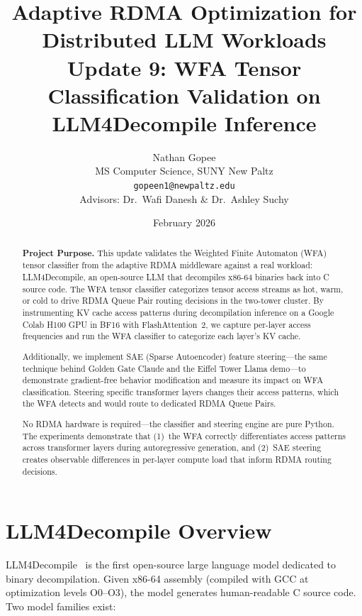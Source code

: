\documentclass[11pt,letterpaper]{article}
\title{\textbf{Adaptive RDMA Optimization for Distributed LLM Workloads}\\[0.5em]
\large Update 9: WFA Tensor Classification Validation on LLM4Decompile Inference}
\author{Nathan Gopee\\
MS Computer Science, SUNY New Paltz\\
\texttt{gopeen1@newpaltz.edu}\\[1em]
\small Advisors: Dr.\ Wafi Danesh \& Dr.\ Ashley Suchy}
\date{February 2026}
\begin{document}
\maketitle

\begin{abstract}
\noindent
\textbf{Project Purpose.}
This update validates the Weighted Finite Automaton (WFA) tensor classifier from the adaptive RDMA middleware against a real workload: LLM4Decompile, an open-source LLM that decompiles x86-64 binaries back into C source code. The WFA tensor classifier categorizes tensor access streams as hot, warm, or cold to drive RDMA Queue Pair routing decisions in the two-tower cluster. By instrumenting KV cache access patterns during decompilation inference on a Google Colab H100 GPU in BF16 with FlashAttention~2, we capture per-layer access frequencies and run the WFA classifier to categorize each layer's KV cache.

Additionally, we implement SAE (Sparse Autoencoder) feature steering---the same technique behind Golden Gate Claude and the Eiffel Tower Llama demo---to demonstrate gradient-free behavior modification and measure its impact on WFA classification. Steering specific transformer layers changes their access patterns, which the WFA detects and would route to dedicated RDMA Queue Pairs.

No RDMA hardware is required---the classifier and steering engine are pure Python. The experiments demonstrate that (1)~the WFA correctly differentiates access patterns across transformer layers during autoregressive generation, and (2)~SAE steering creates observable differences in per-layer compute load that inform RDMA routing decisions.
\end{abstract}

\tableofcontents
\newpage

\section{LLM4Decompile Overview}
\label{sec:llm4decompile}

LLM4Decompile~\cite{llm4decompile} is the first open-source large language model dedicated to binary decompilation. Given x86-64 assembly (compiled with GCC at optimization levels O0--O3), the model generates human-readable C source code. Two model families exist:
\end{document}
